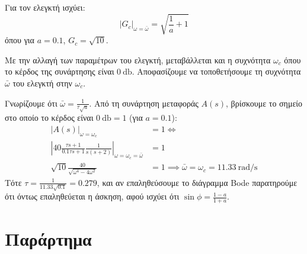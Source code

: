 \documentclass[11pt,a4paper,notitlepage,fleqn,final]{article}
\begin{document}
\begin{exercise}
\begin{enumgreekparen}
	\item Για τον ελεγκτή ισχύει:
	\[
	\left|G_c\right|_{\omega=\bar\omega} = \sqrt{\frac{1}{a} + 1}
	\]
	όπου για \( a=0.1 \), \( G_c = \sqrt{10} \).
	
	Με την αλλαγή των παραμέτρων του ελεγκτή, μεταβάλλεται και η συχνότητα \( \omega_c \)
	όπου το κέρδος της συνάρτησης είναι \( \SI{0}{\decibel} \). Αποφασίζουμε να τοποθετήσουμε
	τη συχνότητα \( \bar\omega \) του ελεγκτή στην \( \omega_c \).
	
	Γνωρίζουμε ότι \( \bar\omega = \frac{1}{τ\sqrt{a}} \). Από τη συνάρτηση μεταφοράς
	\( A(s) \), βρίσκουμε το σημείο στο οποίο το κέρδος είναι \( \SI{0}{\decibel} = 1 \)
	(για \( a=0.1 \)):
	\begin{align*}
	\left|A(s)\right|_{\omega=\omega_c} &= 1 \iff \\
		\left| 40\frac{τs+1}{0.1τs+1}\frac{1}{s(s+2)}\right|_{\omega=\omega_c=\bar\omega} &= 1\\
		\sqrt{10}\frac{40}{\sqrt{\omega^4-4\omega^2}}&=1 \implies
	\bar\omega = \omega_c = \SI{11.33}{\radian/\second}
	\end{align*}
	Τότε \( τ=\frac{1}{11.33\sqrt{0.1}}=0.279 \), και αν επαληθεύσουμε το διάγραμμα Bode
	παρατηρούμε ότι όντως επαληθεύεται η άσκηση, αφού ισχύει ότι \( \sin\phi = \frac{1-a}{1+a} \).
\end{enumgreekparen}
\end{exercise}

\newpage
\appendix

\section*{Παράρτημα}

{}

{}

\pagebreak[4]
\end{document}
